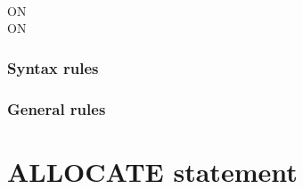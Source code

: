 \begin{syntax}
  \begin{1=}
     \\
  \end{1=}
  \identifier {} \identifier
  \begin{0-1}
  \end{0-1}

  \begin{0+}
    ON   \imperativestatement \\
     ON   \imperativestatement
  \end{0+}

  \begin{0-1}
  \end{0-1}
\end{syntax}

\subsubsection{Syntax rules}

\subsubsection{General rules}

\section{ALLOCATE statement}

\begin{syntax}
  \begin{1=}
    \identifier
    \begin{0-1}
    \end{0-1} \\
    \arithmeticexpression
    \begin{0-1}
    \end{0-1}
  \end{1=}

  \begin{0-1}
     \identifier
  \end{0-1}
\end{syntax}

